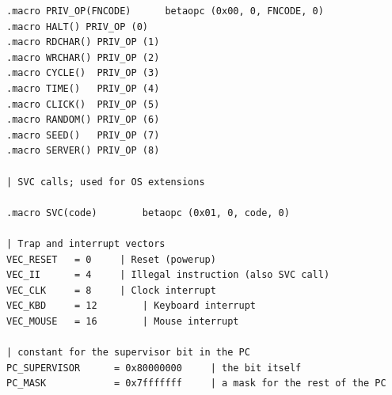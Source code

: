 \documentclass{article}
\begin{document}
\begin{lstlisting}
.macro PRIV_OP(FNCODE)		betaopc (0x00, 0, FNCODE, 0)
.macro HALT() PRIV_OP (0)
.macro RDCHAR() PRIV_OP (1)
.macro WRCHAR() PRIV_OP (2)
.macro CYCLE()	PRIV_OP (3)
.macro TIME()	PRIV_OP (4)
.macro CLICK()	PRIV_OP (5)
.macro RANDOM()	PRIV_OP (6)
.macro SEED()	PRIV_OP (7)
.macro SERVER() PRIV_OP (8)

| SVC calls; used for OS extensions

.macro SVC(code)		betaopc (0x01, 0, code, 0)

| Trap and interrupt vectors
VEC_RESET	= 0		| Reset (powerup)
VEC_II		= 4		| Illegal instruction (also SVC call)
VEC_CLK		= 8		| Clock interrupt
VEC_KBD		= 12		| Keyboard interrupt
VEC_MOUSE	= 16		| Mouse interrupt

| constant for the supervisor bit in the PC
PC_SUPERVISOR	   = 0x80000000		| the bit itself
PC_MASK            = 0x7fffffff		| a mask for the rest of the PC
\end{lstlisting}
\end{document}
